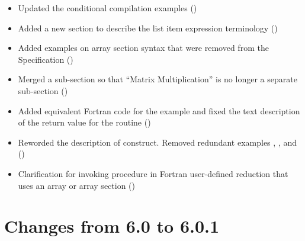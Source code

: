 \begin{itemize}
\begin{itemize}
  \item Updated the conditional compilation examples
    ()
  \item Added a new section to describe the list item expression terminology
    ()
  \item Added examples on array section syntax that were removed
     from the Specification
    ()
  \item Merged a sub-section so that ``Matrix Multiplication'' is
     no longer a separate sub-section
    ()
  \item Added equivalent Fortran code for the example
      and fixed the text description
     of the return value for the  routine
    ()
  \item Reworded the description of  construct.
    Removed redundant examples ,
    , and 
    ()
  \item Clarification for invoking procedure in Fortran user-defined
     reduction that uses an array or array section
    ()
\end{itemize}
\end{itemize}

\section{Changes from 6.0 to 6.0.1}
\label{sec:history_60_to_601}

